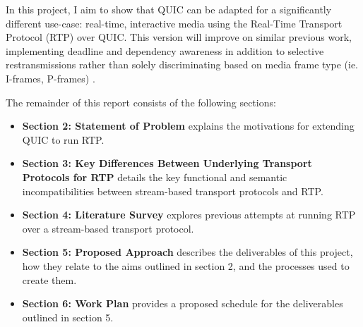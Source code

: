 \documentclass{mprop}
\begin{document}
In this project, I aim to show that QUIC can be adapted for a significantly different use-case: 
real-time, interactive media using the Real-Time Transport Protocol (RTP) \cite{RTP-RFC} over 
QUIC. This version will improve on similar previous work, implementing deadline and dependency 
awareness in addition to selective restransmissions rather than solely discriminating based on 
media frame type (ie. I-frames, P-frames) \cite {Palmer2018}.


The remainder of this report consists of the following sections:

\begin{itemize}
	\item \textbf{Section 2: Statement of Problem} explains the motivations for extending QUIC to 
	run RTP.
	\item \textbf{Section 3: Key Differences Between Underlying Transport Protocols for RTP} 
	details the key functional and semantic incompatibilities between stream-based transport 
	protocols and RTP.
	\item \textbf{Section 4: Literature Survey} explores previous attempts at running RTP over a 
	stream-based transport protocol.
	\item \textbf{Section 5: Proposed Approach} describes the deliverables of this project, how 
	they relate to the aims outlined in section 2, and the processes used to create them.
	\item \textbf{Section 6: Work Plan} provides a proposed schedule for the deliverables outlined 
	in section 5.
\end{itemize}

\end{document}
